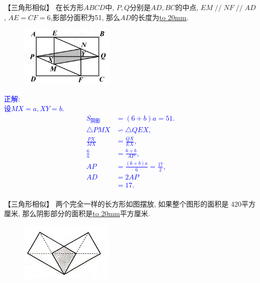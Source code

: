 \item {
    【三角形相似】
    在长方形$ABCD$中, $P,Q$分别是$AD,BC$的中点, $EM\mathop{//}NF\mathop{//}AD$, $AE=CF=6$,影部分面积为51, 那么$AD$的长度为\underline{\hbox to 20mm{}}.
    \begin{figure}[H] 
        \centering
        \includegraphics[width=0.4\textwidth]{./pics/Chapter_2/1.png}
    \end{figure}
    \ifshowSolution 
        \fangsong{}\textcolor{blue}{
            正解: \\
            设$MX=a, XY =b$.\\
            \begin{align*}
                S_{阴影} &= (6+b)a = 51. \\
                \triangle PMX &\backsim \triangle QEX,\\
                \frac{PX}{MX} &= \frac{QX}{EX}, \\
                \frac{6}{a} &= \frac{6+b}{AP}, \\
                AP &= \frac{(6+b)a}{6} = \frac{17}{2}, \\
                AD &= 2AP \\
                &= 17. \\
            \end{align*}
        }
    \else
        \vspace{1cm}
    \fi
}

\item {
    【三角形相似】
    两个完全一样的长方形如图摆放, 如果整个图形的面积是 420平方厘米, 那么阴影部分的面积是\underline{\hbox to 20mm{}}平方厘米.
    \begin{figure}[H]
        \centering
        \includegraphics[width=0.4\textwidth]{./pics/Chapter_2/5.png}
    \end{figure}
    \vspace{1cm}
}

